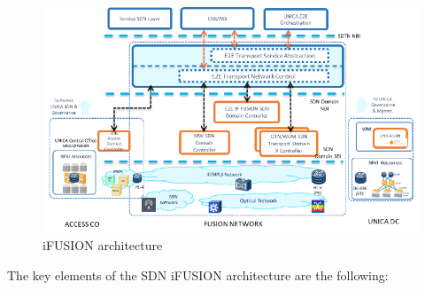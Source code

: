 \documentclass[a4paper,fleqn]{cas-dc}
\begin{document}
\begin{figure}
	\centering
		\includegraphics[scale=1]{figs/ifusion_architecture.png}
	\caption{iFUSION architecture}
	\label{FIG:1}
\end{figure}

The key elements of the SDN iFUSION architecture are the following:
\end{document}
